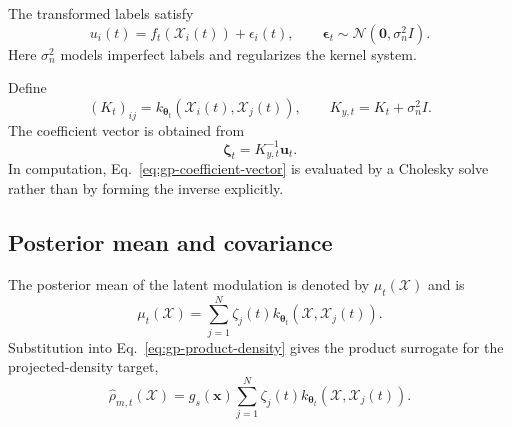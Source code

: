 \documentclass[
  11pt,
  letterpaper,
  onehalfspacing,
  normalmargins,
  equalmargins,
  oneside
]{ut-thesis}
\begin{document}
The transformed labels satisfy
\begin{equation}
u_i(t)
=
f_t\!\left(\boldsymbol{\mathcal X}_i(t)\right)
+
\epsilon_i(t),
\qquad
\boldsymbol\epsilon_t
\sim
\mathcal N\!\left(
\mathbf 0,
\sigma_n^2 I
\right).
\label{eq:gp-modulation-observation-model}
\end{equation}
Here \(\sigma_n^2\) models imperfect labels and regularizes the kernel
system.

Define
\begin{equation}
(K_t)_{ij}
=
 k_{\boldsymbol\theta_t}
\left(
\boldsymbol{\mathcal X}_i(t),
\boldsymbol{\mathcal X}_j(t)
\right),
\qquad
K_{y,t}
=
K_t+\sigma_n^2 I.
\label{eq:gp-kernel-matrices}
\end{equation}
The coefficient vector is obtained from
\begin{equation}
\boldsymbol\zeta_t
=
K_{y,t}^{-1}\mathbf u_t.
\label{eq:gp-coefficient-vector}
\end{equation}
In computation, Eq.~\eqref{eq:gp-coefficient-vector} is evaluated by a
Cholesky solve rather than by forming the inverse explicitly.


\subsection{Posterior mean and covariance}
\label{subsec:gp-posterior-mean-density}

The posterior mean of the latent modulation is denoted by
\(\mu_t(\boldsymbol{\mathcal X})\) and is
\begin{equation}
\mu_t(\boldsymbol{\mathcal X})
=
\sum_{j=1}^{N}
\zeta_j(t)
 k_{\boldsymbol\theta_t}
\left(
\boldsymbol{\mathcal X},
\boldsymbol{\mathcal X}_j(t)
\right).
\label{eq:gp-modulation-posterior-mean}
\end{equation}
Substitution into Eq.~\eqref{eq:gp-product-density} gives the product
surrogate for the projected-density target,
\begin{equation}
\widehat{\rho}_{m,t}(\boldsymbol{\mathcal X})
=
 g_s(\mathbf x)
\sum_{j=1}^{N}
\zeta_j(t)
 k_{\boldsymbol\theta_t}
\left(
\boldsymbol{\mathcal X},
\boldsymbol{\mathcal X}_j(t)
\right).
\label{eq:gp-product-density-expansion}
\end{equation}
\end{document}
